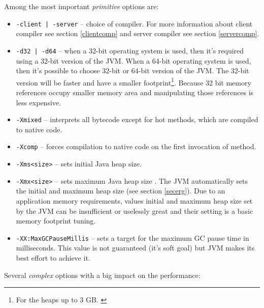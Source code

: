 \documentclass[
  digital, %
  oneside,
  notable, %
  nolof,     %
  nolot     %
]{fithesis3}
\begin{document}
Among the most important \textit{primitive} options are:
\begin{itemize}
	\item \texttt{-client | -server} -- choice of compiler. For more information about client compiler see section \ref{clientcomp} and server compiler see section \ref{servercomp}.
	\item \texttt{-d32 | -d64} -- when a 32-bit operating system is used, then it's required using a 32-bit version of the JVM. When a 64-bit operating system is used, then it's possible to choose 32-bit or 64-bit version of the JVM. The 32-bit version will be faster and have a smaller footprint\footnote{For the heaps up to 3 GB. \cite{scott}}. Because 32 bit memory references occupy smaller memory area and manipulating those references is less expensive. \cite{scott}
	\item \texttt{-Xmixed} -- interprets all bytecode except for hot methods, which are compiled to native code. \cite{java}
	\item \texttt{-Xcomp} -- forces compilation to native code on the first invocation of method. \cite{java}
	\item \texttt{-Xms<size>} -- sets initial Java heap size. \cite{java}
	\item \texttt{-Xmx<size>} -- sets maximum Java heap size \cite{java}. The JVM automatically sets the initial and maximum heap size (see section \ref{secerg}). Due to an application memory requirements, values initial and maximum heap size set by the JVM can be insufficient or uselessly great and their setting is a basic memory footprint tuning.
	\item \texttt{-XX:MaxGCPauseMillis} -- sets a target for the maximum GC pause time in milliseconds. This value is not guaranteed (it's soft goal) but JVM makes its best effort to achieve it.
\end{itemize}
Several \textit{complex} options with a big impact on the performance:
\end{document}
